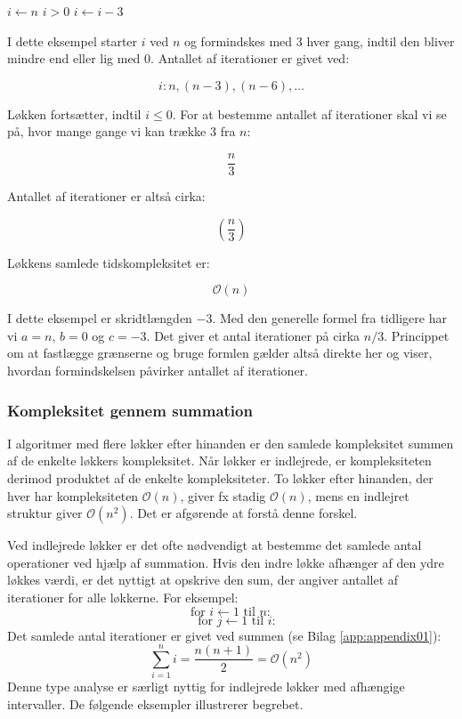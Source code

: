 \begin{example}

    \begin{codebox}
        \li $i \gets n$
        \li \While $i > 0$ \Do
        \li     {}
        \li     $i \gets i - 3$
            \End
    \end{codebox}

    I dette eksempel starter $i$ ved $n$ og formindskes med $3$ hver gang, indtil den bliver mindre end eller lig med $0$. Antallet af iterationer er givet ved:

    \[
    i: n, (n - 3), (n - 6), \dots
    \]

    Løkken fortsætter, indtil $i \leq 0$. For at bestemme antallet af iterationer skal vi se på, hvor mange gange vi kan trække $3$ fra $n$:

    \[
    \frac{n}{3}
    \]

    Antallet af iterationer er altså cirka:

    \[
    \left( \frac{n}{3} \right)
    \]

    Løkkens samlede tidskompleksitet er:

    \[
    \mathcal{O}(n)
    \] 

    I dette eksempel er skridtlængden $-3$. Med den generelle formel fra tidligere har vi $a = n$, $b = 0$ og $c = -3$. Det giver et antal iterationer på cirka $n / 3$. Princippet om at fastlægge grænserne og bruge formlen gælder altså direkte her og viser, hvordan formindskelsen påvirker antallet af iterationer.

\end{example}


\subsubsection*{Kompleksitet gennem summation}
I algoritmer med flere løkker efter hinanden er den samlede kompleksitet summen af de enkelte løkkers kompleksitet. Når løkker er indlejrede, er kompleksiteten derimod produktet af de enkelte kompleksiteter. To løkker efter hinanden, der hver har kompleksiteten $\mathcal{O}(n)$, giver fx stadig $\mathcal{O}(n)$, mens en indlejret struktur giver $\mathcal{O}(n^2)$. Det er afgørende at forstå denne forskel.

Ved indlejrede løkker er det ofte nødvendigt at bestemme det samlede antal operationer ved hjælp af summation. Hvis den indre løkke afhænger af den ydre løkkes værdi, er det nyttigt at opskrive den sum, der angiver antallet af iterationer for alle løkkerne. For eksempel:
\[
\text{for } i \gets 1 \text{ til } n:
\]
\[
\quad \text{for } j \gets 1 \text{ til } i:
\]
Det samlede antal iterationer er givet ved summen (se Bilag \ref{app:appendix01}):
\[
\sum_{i=1}^{n} i = \frac{n(n + 1)}{2} = \mathcal{O}(n^2)
\]
Denne type analyse er særligt nyttig for indlejrede løkker med afhængige intervaller. De følgende eksempler illustrerer begrebet.

